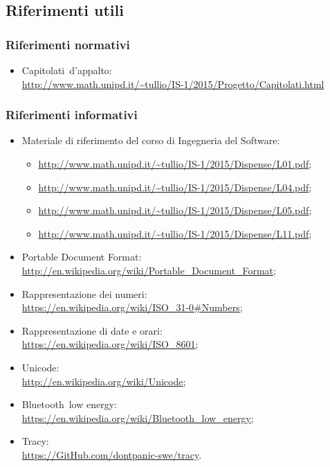 \documentclass[../NormeProgetto.tex]{subfiles}
\begin{document}
	\subsection{Riferimenti utili}
		\subsubsection{Riferimenti normativi}
		\begin{itemize}
			\item Capitolati\g\ d'appalto: \\\url{http://www.math.unipd.it/~tullio/IS-1/2015/Progetto/Capitolati.html}
		\end{itemize}
		\subsubsection{Riferimenti informativi}
		\begin{itemize}
			\item Materiale di riferimento del corso di Ingegneria del Software:
				\begin{itemize}
					 \item \url{http://www.math.unipd.it/~tullio/IS-1/2015/Dispense/L01.pdf};
					 \item \url{http://www.math.unipd.it/~tullio/IS-1/2015/Dispense/L04.pdf};
					 \item \url{http://www.math.unipd.it/~tullio/IS-1/2015/Dispense/L05.pdf};
					 \item \url{http://www.math.unipd.it/~tullio/IS-1/2015/Dispense/L11.pdf};
				\end{itemize}
			\item Portable Document Format:  \\\url{http://en.wikipedia.org/wiki/Portable_Document_Format};
			\item Rappresentazione dei numeri: \\\url{https://en.wikipedia.org/wiki/ISO_31-0#Numbers};
			\item Rappresentazione di date e orari: \\\url{https://en.wikipedia.org/wiki/ISO_8601};
			\item Unicode\g: \\\url{http://en.wikipedia.org/wiki/Unicode};
			\item Bluetooth\g\ low energy: \\\url{https://en.wikipedia.org/wiki/Bluetooth_low_energy};
			\item Tracy\g: \\\url{https://GitHub.com/dontpanic-swe/tracy}.
		\end{itemize}
\end{document}
